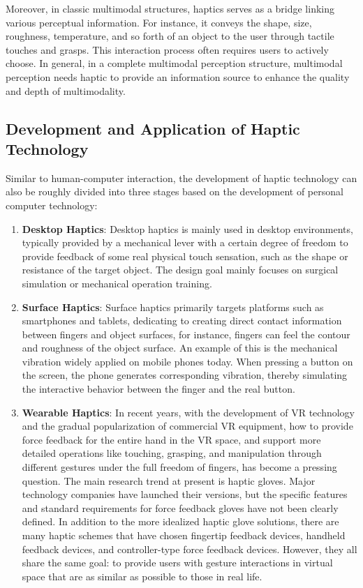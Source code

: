 Moreover, in classic multimodal structures, haptics serves as a bridge linking various perceptual information. For instance, it conveys the shape, size, roughness, temperature, and so forth of an object to the user through tactile touches and grasps. This interaction process often requires users to actively choose. In general, in a complete multimodal perception structure, multimodal perception needs haptic to provide an information source to enhance the quality and depth of multimodality.

\subsection{Development and Application of Haptic Technology}
Similar to human-computer interaction, the development of haptic technology can also be roughly divided into three stages\cite{paper20} based on the development of personal computer technology:

\begin{enumerate}
    \item \textbf{Desktop Haptics}: Desktop haptics is mainly used in desktop environments, typically provided by a mechanical lever with a certain degree of freedom to provide feedback of some real physical touch sensation, such as the shape or resistance of the target object. The design goal mainly focuses on surgical simulation or mechanical operation training.

    \item \textbf{Surface Haptics}: Surface haptics primarily targets platforms such as smartphones and tablets, dedicating to creating direct contact information between fingers and object surfaces, for instance, fingers can feel the contour and roughness of the object surface. An example of this is the mechanical vibration widely applied on mobile phones today. When pressing a button on the screen, the phone generates corresponding vibration, thereby simulating the interactive behavior between the finger and the real button.

    \item \textbf{Wearable Haptics}: In recent years, with the development of VR technology and the gradual popularization of commercial VR equipment, how to provide force feedback for the entire hand in the VR space, and support more detailed operations like touching, grasping, and manipulation through different gestures under the full freedom of fingers, has become a pressing question. The main research trend at present is haptic gloves. Major technology companies have launched their versions, but the specific features and standard requirements for force feedback gloves have not been clearly defined. In addition to the more idealized haptic glove solutions, there are many haptic schemes that have chosen fingertip feedback devices, handheld feedback devices, and controller-type force feedback devices. However, they all share the same goal: to provide users with gesture interactions in virtual space that are as similar as possible to those in real life.
\end{enumerate}

